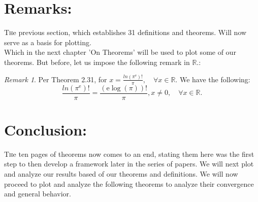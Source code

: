 \documentclass[10pt]{article}
\theoremstyle{plain}
\theoremstyle{definition}
\theoremstyle{remark}
\newtheorem{remark}[theorem]{Remark}
\begin{document}
\section{Remarks:}
\lettrine[lines=2, lhang=0.1, loversize=0.2]{T}he previous section, which establishes 31 definitions and theorems. Will now serve as a basis for plotting.\\
Which in the next chapter 'On Theorems' will be used to plot some of our theorems. But before, let us impose the following remark in $\mathbb{R}.$:

\begin{remark}
	Per Theorem 2.31, for $x = \frac{ln(\pi^\mathrm{e})!}{\pi}, \quad \forall x \in \mathbb{R}.$ We have the following:
	\begin{equation}
		\frac{ln(\pi^\mathrm{e})!}{\pi} = \frac{(\mathrm{e} \log(\pi))!}{\pi}, x \neq 0, \quad \forall x \in \mathbb{R}.
	\end{equation}
\end{remark}

\section{Conclusion:}

\lettrine[lines=2, lhang=0.1, loversize=0.2]{T}he ten pages of theorems now comes to an end, stating them here was the first step to then develop a framework later in the series of papers. We will next plot and analyze our results based of our theorems and definitions. We will now proceed to plot and analyze the following theorems to analyze their convergence and general behavior.

\nocite{*}



\end{document}
